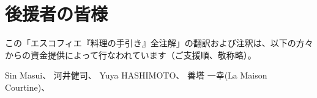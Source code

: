 \hypertarget{benefactors}{%
\section{後援者の皆様}\label{benefactors}}

\thispagestyle{empty}

この「エスコフィエ『料理の手引き』全注解」の翻訳および注釈は、以下の方々からの資金提供によって行なわれています（ご支援順、敬称略）。

Sin Masui、\href{20180524-23h,2x,novelsoundsmail@gmail.com}{}
河井健司、\href{20180525-0h14,10x,kwibeng@gmail.com}{} Yuya
HASHIMOTO、\href{20180525-1h40,2x,hashimo0910@gmail.com}{} 善塔 一幸(La
Maison
Courtine)、\href{20180525-8h56,10x,kazuyukizento120@docomo.ne.jp}{}

